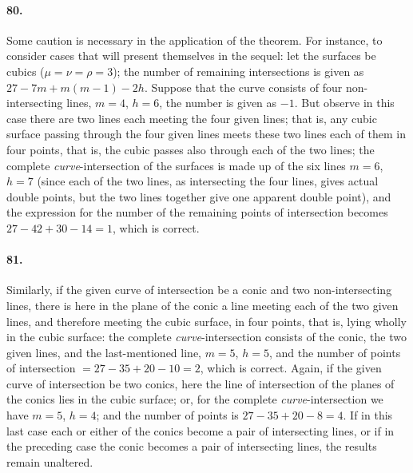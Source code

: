 \documentclass[11pt]{article}
\begin{document}
\medskip

\paragraph{80.}
Some caution is necessary in the application of the theorem. For
instance, to consider cases that will present themselves in the sequel:
let the surfaces be cubics ($\mu=\nu=\rho=3$); the number of remaining
intersections is given as $27-7m+m(m-1)-2h$. Suppose that the curve
consists of four non-intersecting lines, $m=4$, $h=6$, the number is
given as $-1$. But observe in this case there are two lines each meeting
the four given lines; that is, any cubic surface passing through the
four given lines meets these two lines each of them in four points, that
is, the cubic passes also through each of the two lines; the complete
\textit{curve}-intersection of the surfaces is made up of the six lines
$m=6$, $h=7$ (since each of the two lines, as intersecting the four
lines, gives actual double points, but the two lines together give one
apparent double point), and the expression for the number of the
remaining points of intersection becomes $27-42+30-14=1$, which is
correct.

\medskip

\paragraph{81.}
Similarly, if the given curve of intersection be a conic and two
non-intersecting lines, there is here in the plane of the conic a line
meeting each of the two given lines, and therefore meeting the cubic
surface, in four points, that is, lying wholly in the cubic surface: the
complete \textit{curve}-intersection consists of the conic, the two
given lines, and the last-mentioned line, $m=5$, $h=5$, and the number
of points of intersection $= 27-35+20-10 = 2$, which is correct. Again,
if the given curve of intersection be two conics, here the line of
intersection of the planes of the conics lies in the cubic surface; or,
for the complete \textit{curve}-intersection we have $m=5$, $h=4$; and
the number of points is $27-35+20-8 = 4$. If in this last case each or
either of the conics become a pair of intersecting lines, or if in the
preceding case the conic becomes a pair of intersecting lines, the
results remain unaltered.

\medskip
\end{document}
